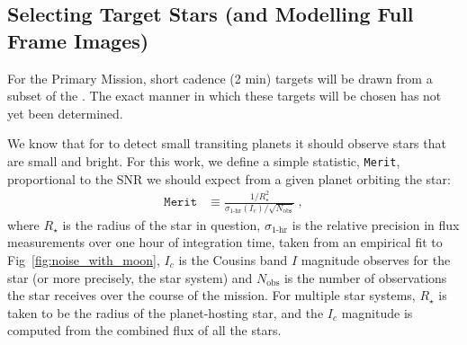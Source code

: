 \subsection{Selecting Target Stars (and Modelling Full Frame Images)}
\label{sec:selection_criteria}
For the Primary Mission, \tesss short cadence (2 min) targets will be drawn from a subset of the \tic. 
The exact manner in which these targets will be chosen has not yet been determined.

We know that for \tess to detect small transiting planets
it should observe stars that are small and bright.  For this work, we
define a simple statistic, \texttt{Merit}, proportional to the SNR we
should expect from a given planet orbiting the star:
\begin{align}
\texttt{Merit} &\equiv 
	\frac{1/R_\star^2}{\sigma_\text{1-hr}(I_c)/\sqrt{N_\text{obs}}}\ ,
\label{eq:merit}
\end{align}
where $R_\star$ is the radius of the star in question,
$\sigma_\text{1-hr}$ is the relative precision in flux measurements
over one hour of integration time, taken from an empirical fit to
Fig~\ref{fig:noise_with_moon}, $I_c$ is the Cousins band $I$ magnitude
\tess observes for the star (or more precisely, the star system) and
$N_\text{obs}$ is the number of observations the star receives over
the course of the mission.  For multiple star systems, $R_\star$ is
taken to be the radius of
the planet-hosting star, and the $I_c$ magnitude is computed from the 
combined flux of all the stars.

